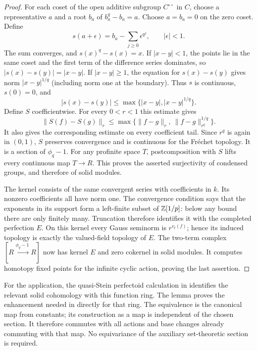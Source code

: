 \begin{proof}
For each coset of the open additive subgroup $C^{\circ\circ}$ in $C$,
choose a representative $a$ and a root $b_a$ of $b_a^q-b_a=a$.
Choose $a=b_a=0$ on the zero coset.  Define
\[
 s(a+\epsilon)=b_a-\sum_{j\ge0}\epsilon^{q^j},
 \qquad |\epsilon|<1.
\]
The sum converges, and $s(x)^q-s(x)=x$.
If $|x-y|<1$, the points lie in the same coset and the first term
of the difference series dominates, so $|s(x)-s(y)|=|x-y|$.
If $|x-y|\ge1$, the equation for $s(x)-s(y)$ gives norm
$|x-y|^{1/q}$ (including norm one at the boundary).
Thus $s$ is continuous, $s(0)=0$, and
\[
 |s(x)-s(y)|\le\max\{|x-y|,|x-y|^{1/q}\}.
\]
Define $S$ coefficientwise.  For every $0<r<1$ this estimate gives
\[
 \|S(f)-S(g)\|_r
 \le\max\{\|f-g\|_r,\ \|f-g\|_{r^q}^{1/q}\}.
\]
It also gives the corresponding estimate on every coefficient tail.
Since $r^q$ is again in $(0,1)$, $S$ preserves convergence and is
continuous for the Fr\'echet topology.  It is a section of $\phi_q-1$.
For any profinite space $T$, postcomposition with $S$ lifts every
continuous map $T\to R$.  This proves the asserted surjectivity of
condensed groups, and therefore of solid modules.

The kernel consists of the same convergent series with coefficients in
$k$.  Its nonzero coefficients all have norm one.  The convergence
condition says that the exponents in its support form a left-finite
subset of $\mathbb Z[1/p]$: below any bound there are only finitely many.
Truncation therefore identifies it with the completed perfection $E$.
On this kernel every Gauss seminorm is $r^{v_t(f)}$; hence its induced
topology is exactly the valued-field topology of $E$.
The two-term complex $[R\xrightarrow{\phi_q-1}R]$ now has kernel
$E$ and zero cokernel in solid modules.  It computes homotopy fixed
points for the infinite cyclic action, proving the last assertion.
\end{proof}

For the application, the quasi-Stein perfectoid calculation in
\cite[Lemma~3.6.2]{BMR2026} identifies the relevant solid cohomology
with this function ring.  The lemma proves the enhancement needed in
\cite[Corollary~3.6.8]{BMR2026} directly for that ring.
The equivalence is the canonical map from constants; its construction
as a map is independent of the chosen section.  It therefore commutes
with all actions and base changes already commuting with that map.
No equivariance of the auxiliary set-theoretic section is required.

